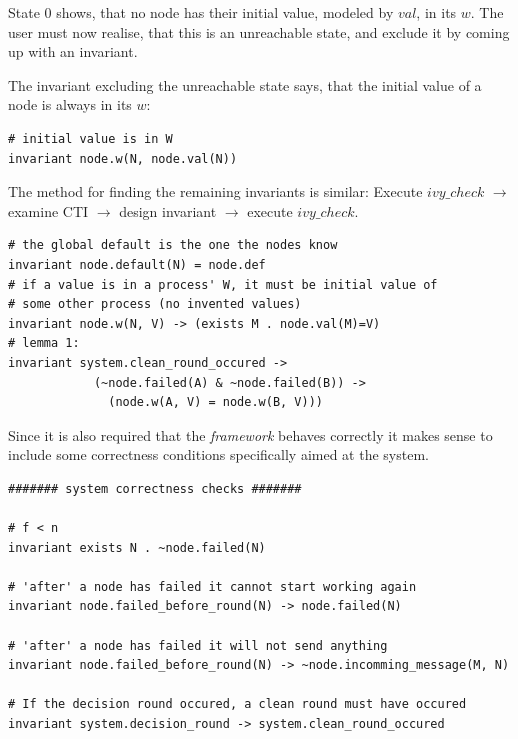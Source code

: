 \documentclass[fleqn]{article}
\begin{document}
\noindent State 0 shows, that no node has their initial value, modeled by $val$,
in its $w$. The user must now realise, that this is an unreachable state, and exclude it by coming
up with an invariant.

The invariant excluding the unreachable state says, that the initial value of a node is always in its $w$:
\begin{mdframed}[backgroundcolor=light-gray, roundcorner=10pt,leftmargin=1, rightmargin=1, innerleftmargin=15, innertopmargin=15,innerbottommargin=15, outerlinewidth=1, linecolor=light-gray]
\begin{lstlisting}
# initial value is in W
invariant node.w(N, node.val(N))
\end{lstlisting}
\end{mdframed}

The method for finding the remaining invariants is similar: Execute $ivy\_check$ $\rightarrow$ examine CTI $\rightarrow$ design invariant $\rightarrow$ execute $ivy\_check$.
\begin{mdframed}[backgroundcolor=light-gray, roundcorner=10pt,leftmargin=1, rightmargin=1, innerleftmargin=15, innertopmargin=15,innerbottommargin=15, outerlinewidth=1, linecolor=light-gray]
\begin{lstlisting}
# the global default is the one the nodes know
invariant node.default(N) = node.def
# if a value is in a process' W, it must be initial value of
# some other process (no invented values)
invariant node.w(N, V) -> (exists M . node.val(M)=V)
# lemma 1:
invariant system.clean_round_occured ->
            (~node.failed(A) & ~node.failed(B)) ->
              (node.w(A, V) = node.w(B, V)))
\end{lstlisting}
\end{mdframed}



Since it is also required that the \textit{framework} behaves correctly it makes sense to include some
correctness conditions specifically aimed at the system.

\begin{mdframed}[backgroundcolor=light-gray, roundcorner=10pt,leftmargin=1, rightmargin=1, innerleftmargin=15, innertopmargin=15,innerbottommargin=15, outerlinewidth=1, linecolor=light-gray]
\begin{lstlisting}
####### system correctness checks #######

# f < n
invariant exists N . ~node.failed(N)

# 'after' a node has failed it cannot start working again
invariant node.failed_before_round(N) -> node.failed(N)

# 'after' a node has failed it will not send anything
invariant node.failed_before_round(N) -> ~node.incomming_message(M, N)

# If the decision round occured, a clean round must have occured
invariant system.decision_round -> system.clean_round_occured

\end{lstlisting}
\end{mdframed}
\end{document}
